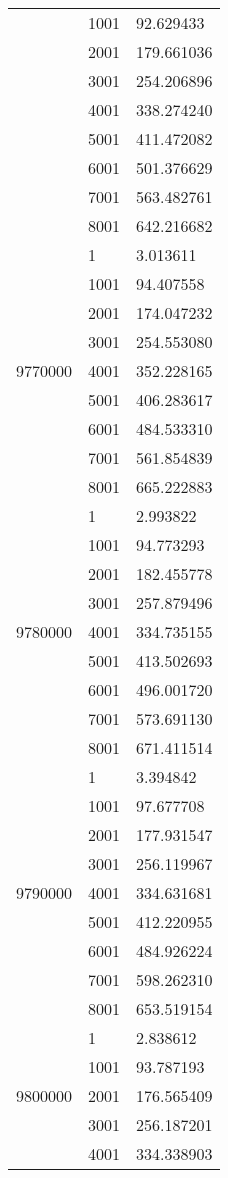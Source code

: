 \begin{table}[htb!]
\begin{tabular}{lll}
 & 1001 & 92.629433 \\
 & 2001 & 179.661036 \\
 & 3001 & 254.206896 \\
 & 4001 & 338.274240 \\
 & 5001 & 411.472082 \\
 & 6001 & 501.376629 \\
 & 7001 & 563.482761 \\
 & 8001 & 642.216682 \\
\multirow[c]{9}{*}{9770000} & 1 & 3.013611 \\
 & 1001 & 94.407558 \\
 & 2001 & 174.047232 \\
 & 3001 & 254.553080 \\
 & 4001 & 352.228165 \\
 & 5001 & 406.283617 \\
 & 6001 & 484.533310 \\
 & 7001 & 561.854839 \\
 & 8001 & 665.222883 \\
\multirow[c]{9}{*}{9780000} & 1 & 2.993822 \\
 & 1001 & 94.773293 \\
 & 2001 & 182.455778 \\
 & 3001 & 257.879496 \\
 & 4001 & 334.735155 \\
 & 5001 & 413.502693 \\
 & 6001 & 496.001720 \\
 & 7001 & 573.691130 \\
 & 8001 & 671.411514 \\
\multirow[c]{9}{*}{9790000} & 1 & 3.394842 \\
 & 1001 & 97.677708 \\
 & 2001 & 177.931547 \\
 & 3001 & 256.119967 \\
 & 4001 & 334.631681 \\
 & 5001 & 412.220955 \\
 & 6001 & 484.926224 \\
 & 7001 & 598.262310 \\
 & 8001 & 653.519154 \\
\multirow[c]{9}{*}{9800000} & 1 & 2.838612 \\
 & 1001 & 93.787193 \\
 & 2001 & 176.565409 \\
 & 3001 & 256.187201 \\
 & 4001 & 334.338903 \\

\end{tabular}
\end{table}
